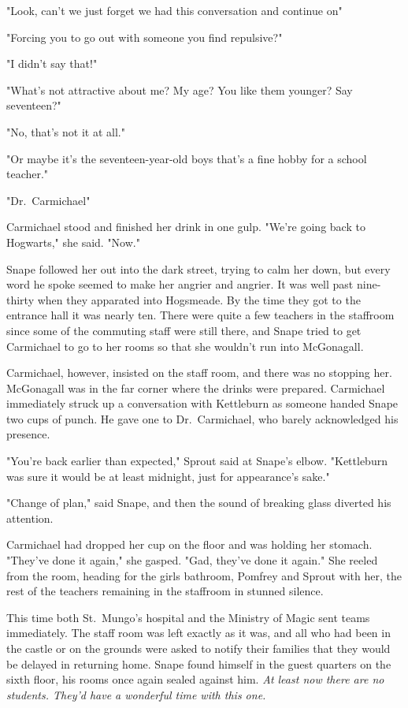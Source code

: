 "Look, can't we just forget we had this conversation and continue on{\el}"

"Forcing you to go out with someone you find repulsive?"

"I didn't say that!"

"What's not attractive about me? My age? You like them younger? Say seventeen?"

"No, that's not it at all."

"Or maybe it's the seventeen-year-old boys{\el} that's a fine hobby for a school teacher."

"Dr.~Carmichael{\el}"

Carmichael stood and finished her drink in one gulp. "We're going back to Hogwarts," she said. "Now."

Snape followed her out into the dark street, trying to calm her down, but every word he spoke seemed to make her angrier and angrier. It was well past nine-thirty when they apparated into Hogsmeade. By the time they got to the entrance hall it was nearly ten. There were quite a few teachers in the staffroom since some of the commuting staff were still there, and Snape tried to get Carmichael to go to her rooms so that she wouldn't run into McGonagall.

Carmichael, however, insisted on the staff room, and there was no stopping her. McGonagall was in the far corner where the drinks were prepared. Carmichael immediately struck up a conversation with Kettleburn as someone handed Snape two cups of punch. He gave one to Dr.~Carmichael, who barely acknowledged his presence.

"You're back earlier than expected," Sprout said at Snape's elbow. "Kettleburn was sure it would be at least midnight, just for appearance's sake."

"Change of plan," said Snape, and then the sound of breaking glass diverted his attention.

Carmichael had dropped her cup on the floor and was holding her stomach. "They've done it again," she gasped. "Gad, they've done it again." She reeled from the room, heading for the girls bathroom, Pomfrey and Sprout with her, the rest of the teachers remaining in the staffroom in stunned silence.

This time both St.~Mungo's hospital and the Ministry of Magic sent teams immediately. The staff room was left exactly as it was, and all who had been in the castle or on the grounds were asked to notify their families that they would be delayed in returning home. Snape found himself in the guest quarters on the sixth floor, his rooms once again sealed against him. \emph{At least now there are no students. They'd have a wonderful time with this one.}

